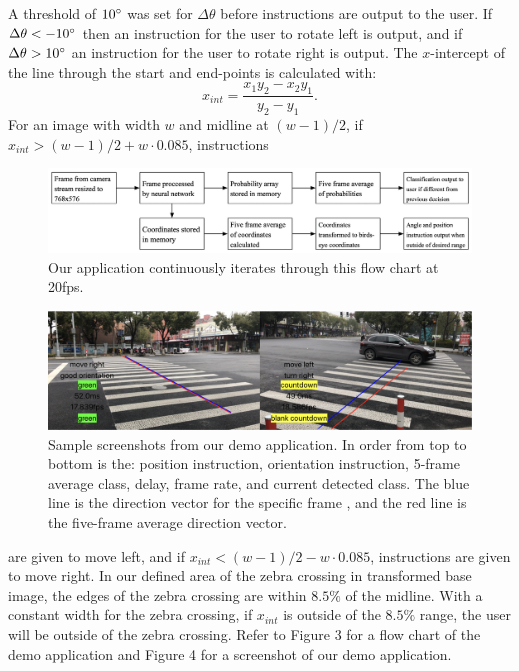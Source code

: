 \documentclass[runningheads]{llncs}
\begin{document}
A threshold of $10\degree$ was set for $\Delta\theta$ before instructions are output to the user. If $\Delta\theta < -10\degree$ then an instruction for the user to rotate left is output, and if $ \Delta\theta > 10\degree $ an instruction for the user to rotate right is output. The $x$-intercept of the line through the start and end-points is calculated with:
\begin{equation}
    x_{int}=\frac{x_1y_2-x_2y_1}{y_2-y_1}.
\end{equation}
For an image with width $w$ and midline at $(w-1)/2$, if $x_{int} > (w-1)/2 + w\cdot0.085$, instructions 
\begin{figure}
\includegraphics[width=\textwidth]{figure3.png}
\caption{Our application continuously iterates through this flow chart at 20fps.} \label{figure4}
\end{figure}
\begin{figure}
\includegraphics[width=\textwidth]{figure4.png}
\caption{Sample screenshots from our demo application. In order from top to bottom is the: position instruction, orientation instruction, 5-frame average class, delay, frame rate, and current detected class. The blue line is the direction vector for the specific frame , and the red line is the five-frame average direction vector.} \label{figure5}
\end{figure}
are given to move left, and if $x_{int} < (w-1)/2 - w\cdot0.085$, instructions are given to move right. In our defined area of the zebra crossing in transformed base image, the edges of the zebra crossing are within $8.5\%$ of the midline. With a constant width for the zebra crossing, if $x_{int}$ is outside of the $8.5\%$ range, the user will be outside of the zebra crossing. Refer to Figure 3 for a flow chart of the demo application and Figure 4 for a screenshot of our demo application. 
\end{document}

